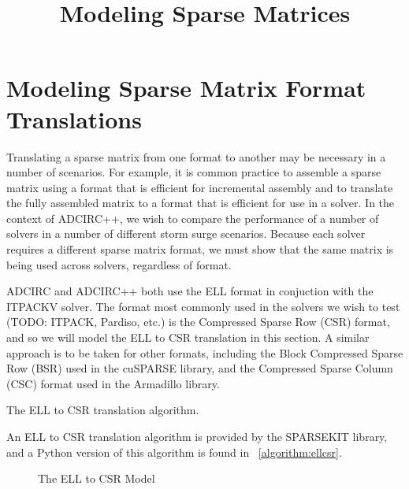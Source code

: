 \documentclass[sigconf]{acmart}
\begin{document}
\pagestyle{plain}
\title{Modeling Sparse Matrices}
\maketitle

\section{Modeling Sparse Matrix Format Translations}

Translating a sparse matrix from one format to another may be necessary in a number of scenarios.  For example, it is common practice to assemble a sparse matrix using a format that is efficient for incremental assembly and to translate the fully assembled matrix to a format that is efficient for use in a solver.  In the context of ADCIRC++, we wish to compare the performance of a number of solvers in a number of different storm surge scenarios.  Because each solver requires a different sparse matrix format, we must show that the same matrix is being used across solvers, regardless of format.

ADCIRC and ADCIRC++ both use the ELL format in conjuction with the ITPACKV solver.  The format most commonly used in the solvers we wish to test (TODO: ITPACK, Pardiso, etc.) is the Compressed Sparse Row (CSR) format, and so we will model the ELL to CSR translation in this section.  A similar approach is to be taken for other formats, including the Block Compressed Sparse Row (BSR) used in the cuSPARSE library, and the Compressed Sparse Column (CSC) format used in the Armadillo library.

\LinesNumbered
\begin{algorithm}

\caption{The ELL to CSR translation algorithm.}
\label{algorithm:ellcsr}
\end{algorithm}
\LinesNotNumbered

An ELL to CSR translation algorithm is provided by the SPARSEKIT library, and a Python version of this algorithm is found in \figurename~\ref{algorithm:ellcsr}.

\begin{figure}

\caption{The ELL to CSR Model}
\label{alloy:csrell}
\end{figure}
\end{document}

